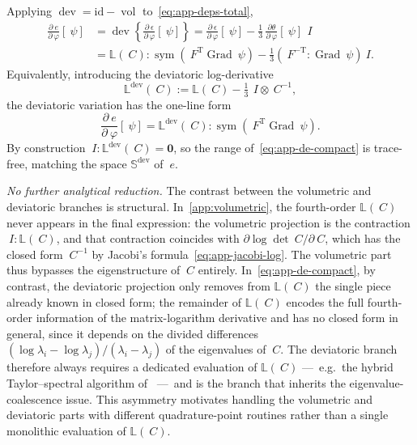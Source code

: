 \documentclass[12pt]{article}
\newcommand{\F}{~F}
\newcommand{\C}{~C}
\newcommand{\eps}{~\epsilon}
\newcommand{\edev}{~e}
\newcommand{\supdev}{^{\mathrm{dev}}}
\newcommand{\Symsd}{\mathbb{S}\supdev}
\DeclareMathOperator{\dev}{dev}
\DeclareMathOperator{\vol}{vol}
\DeclareMathOperator{\Grad}{Grad}
\DeclareMathOperator{\sym}{sym}
\newcommand{\transpose}[1]{{#1}^{\mathrm{T}}}
\begin{document}
Applying $\dev = \mathrm{id} - \vol$ to~\eqref{eq:app-deps-total},
\begin{equation}
  \label{eq:app-de}
  \begin{split}
  \frac{\partial \edev}{\partial ~\varphi}[~\psi]
  & =
  \dev\!\left\{
    \frac{\partial \eps}{\partial ~\varphi}[~\psi]
  \right\}
  =
  \frac{\partial \eps}{\partial ~\varphi}[~\psi]
  -
  \tfrac{1}{3}\,
  \frac{\partial \theta}{\partial ~\varphi}[~\psi]\, ~I
  \\
  & =
  \mathbb{L}(\C) : \sym\!\left(\transpose{\F}\Grad ~\psi\right)
  -
  \tfrac{1}{3}\left(\F^{-\mathrm{T}} : \Grad ~\psi\right)~I.
  \end{split}
\end{equation}
Equivalently, introducing the deviatoric log-derivative
\begin{equation}
  \label{eq:app-Ldev}
  \mathbb{L}\supdev(\C)
  :=
  \mathbb{L}(\C) - \tfrac{1}{3}\, ~I \otimes \C^{-1},
\end{equation}
the deviatoric variation has the one-line form
\begin{equation}
  \label{eq:app-de-compact}
  \frac{\partial \edev}{\partial ~\varphi}[~\psi]
  =
  \mathbb{L}\supdev(\C) : \sym\!\left(\transpose{\F}\Grad ~\psi\right).
\end{equation}
By construction $~I : \mathbb{L}\supdev(\C) = \mathbf{0}$, so the
range of~\eqref{eq:app-de-compact} is trace-free, matching the space
$\Symsd$ of $\edev$.

\textit{No further analytical reduction.} The contrast between the
volumetric and deviatoric branches is structural. In~\ref{app:volumetric},
the fourth-order $\mathbb{L}(\C)$ never appears in the final
expression: the volumetric projection is the contraction
$~I : \mathbb{L}(\C)$, and that contraction coincides with
$\partial \log \det \C / \partial \C$, which has the closed form
$\C^{-1}$ by Jacobi's formula~\eqref{eq:app-jacobi-log}. The
volumetric part thus bypasses the eigenstructure of $\C$ entirely.
In~\eqref{eq:app-de-compact}, by contrast, the deviatoric projection
only removes from $\mathbb{L}(\C)$ the single piece already known in
closed form; the remainder of $\mathbb{L}(\C)$ encodes the full
fourth-order information of the matrix-logarithm derivative and has
no closed form in general, since it depends on the divided
differences $(\log \lambda_i - \log \lambda_j)/(\lambda_i - \lambda_j)$
of the eigenvalues of $\C$. The deviatoric branch therefore always
requires a dedicated evaluation of $\mathbb{L}(\C)$ ---~e.g.\ the
hybrid Taylor--spectral algorithm
of~\citet{Ortiz.Radovitzky.Repetto:2001} ---~and is the branch that
inherits the eigenvalue-coalescence issue. This asymmetry motivates
handling the volumetric and deviatoric parts with different
quadrature-point routines rather than a single monolithic evaluation
of $\mathbb{L}(\C)$.
\end{document}

